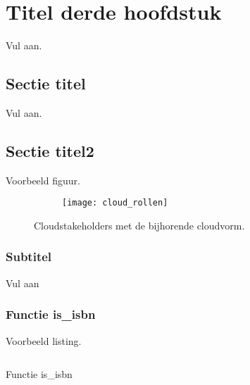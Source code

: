 \chapter{Titel derde hoofdstuk}

Vul aan.


\lipsum[20-24]

\section{Sectie titel}

Vul aan.

\lipsum[32-34]
\section{Sectie titel2}

\lipsum[6-8]

Voorbeeld figuur.

\begin{figure}
	\centering
	\begin{subfigure}{\textwidth}
		\centering
		\centerline{
			\texttt{[image: cloud\_rollen]}
		}
	\end{subfigure}
	\caption{Cloudstakeholders met de bijhorende cloudvorm.}
	\label{fig:cloud_rollen}
\end{figure}

\subsection*{Subtitel}
Vul aan
\subsection{Functie is\_isbn}

Voorbeeld listing.

\begin{listing}[!h]
\inputminted{python}{isbn.py}
\caption{Functie is\_isbn}
\end{listing}